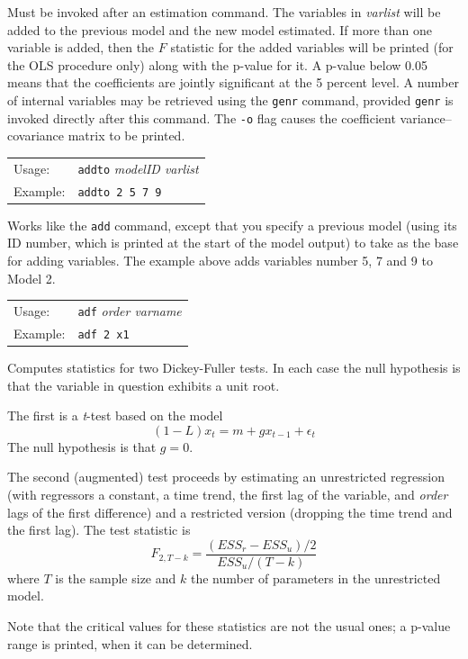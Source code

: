 \documentclass{article}
\begin{document}
{Must be invoked after an estimation command.  The variables
in \textit{varlist} will be added to the previous model and the new
model estimated.  If more than one variable is added, then the $F$
statistic for the added variables will be printed (for the OLS
procedure only) along with the p-value for it.  A p-value below 0.05
means that the coefficients are jointly significant at the 5 percent
level.  A number of internal variables may be retrieved using the
\texttt{genr} command, provided \texttt{genr} is invoked directly
after this command.  The \texttt{-o} flag causes the coefficient
variance--covariance matrix to be printed.


\begin{tabular}{ll}
Usage:  &        \texttt{addto} \textit{modelID varlist }\\
Example: &       \texttt{addto 2 5 7 9} 
\end{tabular}

Works like the \texttt{add} command, except that you specify a
previous model (using its ID number, which is printed at the start of
the model output) to take as the base for adding variables.  The
example above adds variables number 5, 7 and 9 to Model 2.


\begin{tabular}{ll}
Usage:  & \texttt{adf} \textit{order varname}\\
Example: & \texttt{adf 2 x1}
\end{tabular}

Computes statistics for two Dickey-Fuller tests.  In each case the
null hypothesis is that the variable in question exhibits a unit root.

The first is a \textit{t}-test based on the model
$$(1 - L)x_t = m + gx_{t-1} + \epsilon_t$$
The null hypothesis is that $g = 0$.

The second (augmented) test proceeds by estimating an unrestricted
regression (with regressors a constant, a time trend, the first lag of
the variable, and \textit{order} lags of the first difference) and a
restricted version (dropping the time trend and the first lag).  The
test statistic is
$$F_{2, T-k} = \frac{(ESS_r - ESS_u)/2}{ESS_u/(T - k)}$$
where $T$ is the sample size
and $k$ the number of parameters in the unrestricted model.

Note that the critical values for these statistics are not the usual
ones; a p-value range is printed, when it can be determined.

}
\end{document}
